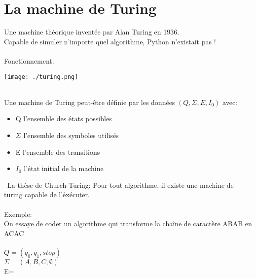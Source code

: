 \documentclass[12pt]{article}   %
\begin{document}
\section{La machine de Turing}
Une machine théorique inventée par Alan Turing en 1936.
\\Capable de simuler n'importe quel algorithme, Python n'existait pas !
\\\\Fonctionnement:
\begin{figure*}[htbp]
	\centering
		\texttt{[image: ./turing.png]}
	\label{fig:turing}
\end{figure*}
\newpage
~\\Une machine de Turing peut-être définie par les données \begin{math}(Q,\Sigma,E,I_{0})\end{math} avec:
\begin{itemize}
	\item Q l'ensemble des états possibles
	\item\begin{math}\Sigma\end{math} l'ensemble des symboles utilisés
	\item E l'ensemble des transitions
	\item\begin{math}I_{0}\end{math} l'état initial de la machine
\end{itemize}
~La thèse de Church-Turing: Pour tout algorithme, il existe une machine de turing capable de l'éxécuter.
\\\\Exemple:\\On essaye de coder un algorithme qui transforme la chaîne de caractère ABAB en ACAC\\\\\begin{math}Q=(q_{0},q_{1},stop)\end{math}\\\begin{math}\Sigma=(A,B,C,\emptyset)\end{math}\\E=
\end{document}
